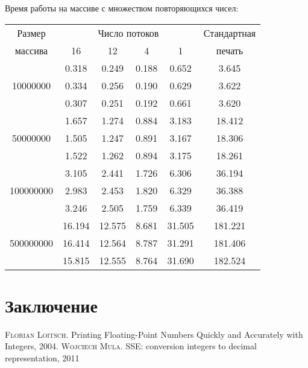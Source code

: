 \documentclass[a4paper, 12pt, twoside]{article}
\begin{document}
Время работы на массиве с множеством повторяющихся чисел:
\begin{center}
\begin{tabular}{||c|c|c|c|c|c||}
\hline
\hline
Размер & \multicolumn{4}{c|}{Число потоков} & Стандартная\\
\hhline{~|-|-|-|-|~|}
массива & 16 & 12 & 4 & 1 & печать \\
\hline
\hline
& 0.318 & 0.249 & 0.188 & 0.652 & 3.645 \\
\hhline{~|-|-|-|-|-|}
10000000 & 0.334 & 0.256 & 0.190 & 0.629 & 3.622 \\
\hhline{~|-|-|-|-|-|}
& 0.307 & 0.251 & 0.192 & 0.661 & 3.620 \\
\hline
& 1.657 & 1.274 & 0.884 & 3.183 & 18.412 \\
\hhline{~|-|-|-|-|-|}
50000000 & 1.505 & 1.247 & 0.891 & 3.167 & 18.306 \\
\hhline{~|-|-|-|-|-|}
& 1.522 & 1.262 & 0.894 & 3.175 & 18.261 \\
\hline
& 3.105 & 2.441 & 1.726 & 6.306 & 36.194 \\
\hhline{~|-|-|-|-|-|}
100000000 & 2.983 & 2.453 & 1.820 & 6.329 & 36.388 \\
\hhline{~|-|-|-|-|-|}
& 3.246 & 2.505 & 1.759 & 6.339 &  36.419 \\
\hline
& 16.194 & 12.575 & 8.681 & 31.505 & 181.221 \\
\hhline{~|-|-|-|-|-|}
500000000 & 16.414 & 12.564 & 8.787 & 31.291 & 181.406 \\
\hhline{~|-|-|-|-|-|}
& 15.815 & 12.555  & 8.764 & 31.690 & 182.524 \\
\hline
\hline
\end{tabular}
\end{center}

\section{Заключение}
\newpage


\newpage
\begin{thebibliography}{}

 \textsc{Florian Loitsch}.
Printing Floating-Point Numbers Quickly and Accurately with Integers, 2004.
 \textsc{Wojciech Mula}.
SSE: conversion integers to decimal representation, 2011


\end{thebibliography}
\end{document}
